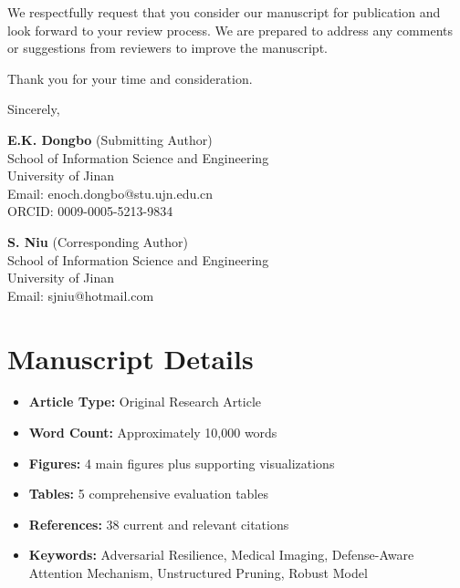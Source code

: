 \documentclass[12pt]{article}
\begin{document}
We respectfully request that you consider our manuscript for publication and look forward to your review process. We are prepared to address any comments or suggestions from reviewers to improve the manuscript.

Thank you for your time and consideration.

\vspace{1cm}

\noindent
Sincerely,

\vspace{1cm}

\noindent
\textbf{E.K. Dongbo} (Submitting Author) \\
School of Information Science and Engineering \\
University of Jinan \\
Email: enoch.dongbo@stu.ujn.edu.cn \\
ORCID: 0009-0005-5213-9834

\vspace{0.5cm}

\noindent
\textbf{S. Niu} (Corresponding Author) \\
School of Information Science and Engineering \\
University of Jinan \\
Email: sjniu@hotmail.com

\section*{Manuscript Details}
\begin{itemize}
    \item \textbf{Article Type:} Original Research Article
    \item \textbf{Word Count:} Approximately 10,000 words
    \item \textbf{Figures:} 4 main figures plus supporting visualizations
    \item \textbf{Tables:} 5 comprehensive evaluation tables
    \item \textbf{References:} 38 current and relevant citations
    \item \textbf{Keywords:} Adversarial Resilience, Medical Imaging, Defense-Aware Attention Mechanism, Unstructured Pruning, Robust Model
\end{itemize}
\end{document}
